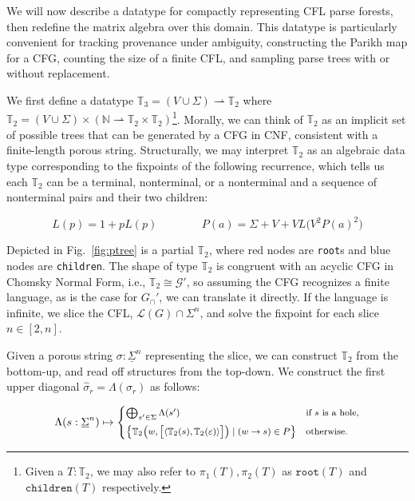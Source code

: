 \documentclass[sigplan,review,acmsmall,nonacm,anonymous]{acmart}\settopmatter{printfolios=false,printccs=false,printacmref=false}
\begin{document}
  We will now describe a datatype for compactly representing CFL parse forests, then redefine the matrix algebra over this domain. This datatype is particularly convenient for tracking provenance under ambiguity, constructing the Parikh map for a CFG, counting the size of a finite CFL, and sampling parse trees with or without replacement.

  We first define a datatype $\mathbb{T}_3 = (V \cup \Sigma) \rightharpoonup \mathbb{T}_2$ where $\mathbb{T}_2 = (V \cup \Sigma) \times (\mathbb{N} \rightharpoonup \mathbb{T}_2\times\mathbb{T}_2)$\footnote{Given a $T:\mathbb{T}_2$, we may also refer to $\pi_1(T), \pi_2(T)$ as $\texttt{root}(T)$ and $\texttt{children}(T)$ respectively.}. Morally, we can think of $\mathbb{T}_2$ as an implicit set of possible trees that can be generated by a CFG in CNF, consistent with a finite-length porous string. Structurally, we may interpret $\mathbb{T}_2$ as an algebraic data type corresponding to the fixpoints of the following recurrence, which tells us each $\mathbb{T}_2$ can be a terminal, nonterminal, or a nonterminal and a sequence of nonterminal pairs and their two children:\vspace{-10pt}

  \begin{equation}
    L(p) = 1 + p L(p) \phantom{addspace} P(a) = \Sigma + V + V L\big(V^2P(a)^2\big)
  \end{equation}

  Depicted in Fig.~\ref{fig:ptree} is a partial $\mathbb{T}_2$, where red nodes are \texttt{root}s and blue nodes are \texttt{children}. The shape of type $\mathbb{T}_2$ is congruent with an acyclic CFG in Chomsky Normal Form, i.e., $\mathbb{T}_2\cong\mathcal{G}'$, so assuming the CFG recognizes a finite language, as is the case for $G_\cap'$, we can translate it directly. If the language is infinite, we slice the CFL, $\mathcal{L}(G)\cap \Sigma^n$, and solve the fixpoint for each slice $n \in [2, n]$.

  Given a porous string $\sigma: \underline\Sigma^n$ representing the slice, we can construct $\mathbb{T}_2$ from the bottom-up, and read off structures from the top-down. We construct the first upper diagonal $\hat\sigma_r = \Lambda(\sigma_r)$ as follows:

\vspace{-5pt}\begin{equation}
  \begin{footnotesize}
\Lambda(s: \underline\Sigma^n) \mapsto \begin{cases}
\bigoplus_{s'\in \Sigma} \Lambda(s') & \text{if $s$ is a hole,} \vspace{5pt}\\
\big\{\mathbb{T}_2\big(w, \big[\langle\mathbb{T}_2(s), \mathbb{T}_2(\varepsilon)\rangle\big]\big) \mid (w \rightarrow s)\in P\big\} & \text{otherwise.}
\end{cases}
  \end{footnotesize}
\end{equation}
\end{document}
